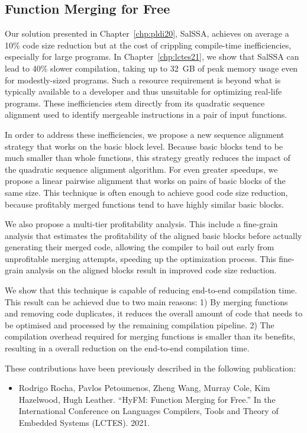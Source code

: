 \subsection{Function Merging for Free}


Our solution presented in Chapter~\ref{chp:pldi20}, SalSSA, achieves on average a 10\% code size reduction but at the cost of crippling compile-time inefficiencies, especially for large programs.
In Chapter~\ref{chp:lctes21}, we show that SalSSA can lead to 40\% slower compilation, taking up to 32~GB of peak memory usage even for modestly-sized programs.
Such a resource requirement is beyond what is typically available to a developer and thus unsuitable for optimizing real-life programs.
These inefficiencies stem directly from its quadratic sequence alignment used to identify mergeable instructions in a pair of input functions.

In order to address these inefficiencies, we propose a new sequence alignment strategy that works on the basic block level.
Because basic blocks tend to  be much smaller than whole functions, this strategy greatly reduces the impact of the quadratic sequence alignment algorithm.
For even greater speedups, we propose a linear pairwise alignment that works on pairs of basic blocks of the same size. 
This technique is often enough to achieve good code size reduction, because profitably merged functions tend to have highly similar basic blocks.

We also propose a multi-tier profitability analysis.
This include a fine-grain analysis that estimates the profitability of the aligned basic blocks before actually generating their merged code,
allowing the compiler to bail out early from unprofitable merging attempts, speeding up the optimization process.
This fine-grain analysis on the aligned blocks result in improved code size reduction.

We show that this technique is capable of reducing end-to-end compilation time.
This result can be achieved due to two main reasons:
1) By merging functions and removing code duplicates, it reduces the overall amount of code that needs to be optimised and processed by the remaining compilation pipeline.
2) The compilation overhead required for merging functions is smaller than its benefits, resulting in a overall reduction on the end-to-end compilation time.

These contributions have been previously described in the following publication:
\begin{itemize}
\item Rodrigo Rocha, Pavlos Petoumenos, Zheng Wang, Murray Cole, Kim Hazelwood, Hugh Leather. ``HyFM: Function Merging for Free.'' In the International Conference on Languages Compilers, Tools and Theory of Embedded Systems (LCTES). 2021.
\end{itemize}

